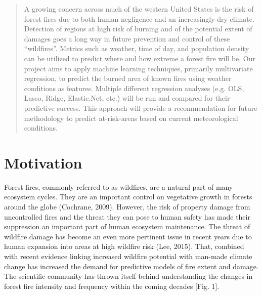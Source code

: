 \documentclass{article}
\begin{document}
 


\begin{abstract} 
A growing concern across much of the western United States is the risk of forest fires due to both human negligence and an increasingly dry climate. Detection of regions at high risk of burning and of the potential extent of damages goes a long way in future prevention and control of these “wildfires”. Metrics such as weather, time of day, and population density can be utilized to predict where and how extreme a forest fire will be. Our project aims to apply machine learning techniques, primarily multivariate regression, to predict the burned area of known fires using weather conditions as features. Multiple different regression analyses (e.g. OLS, Lasso, Ridge, Elastic.Net, etc.) will be run and compared for their predictive success. This approach will provide a recommendation for future methodology to predict at-risk-areas based on current meteorological conditions.
\end{abstract} 

\section{Motivation}

Forest fires, commonly referred to as wildfires, are a natural part of many ecosystem cycles. They are an important control on vegetative growth in forests around the globe (Cochrane, 2009). However, the risk of property damage from uncontrolled fires and the threat they can pose to human safety has made their suppression an important part of human ecosystem maintenance. The threat of wildfire damage has become an even more pertinent issue in recent years due to human expansion into areas at high wildfire risk (Lee, 2015). That, combined with recent evidence linking increased wildfire potential with man-made climate change has increased the demand for predictive models of fire extent and damage. The scientific community has thrown itself behind understanding the changes in forest fire intensity and frequency within the coming decades [Fig. 1].
\end{document}
